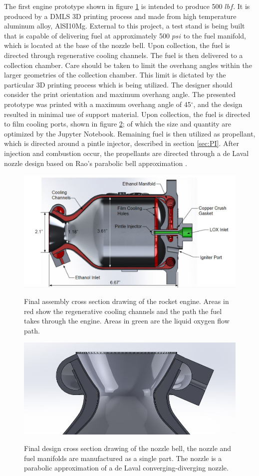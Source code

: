 \documentclass[]{aiaa-tc}%
\begin{document}
The first engine prototype shown in figure \ref{fig:nozzlecross} is intended to produce 500 $lbf$. It is produced by a DMLS 3D printing process and made from high temperature aluminum alloy, AlSI10Mg. External to this project, a test stand  is being built that is capable of delivering fuel at approximately 500 $psi$ to the fuel manifold, which is located at the base of the nozzle bell. Upon collection, the fuel is directed through regenerative cooling channels. The fuel is then delivered to a collection chamber. Care should be taken to limit the overhang angles within the larger geometries of the collection chamber. This limit is dictated by the particular 3D printing process which is being utilized. The designer should consider the print orientation and maximum overhang angle. The presented prototype was printed with a maximum overhang angle of 45$^\circ$, and the design resulted in minimal use of support material. Upon collection, the fuel is directed to film cooling ports, shown in figure \ref{fig:designcross}; of which the size and quantity are optimized by the Jupyter Notebook. Remaining fuel is then utilized as propellant, which is directed around a pintle injector, described in section \ref{sec:PI}. After injection and combustion occur, the propellants are directed through a de Laval nozzle design based on Rao's parabolic bell approximation \cite{rao1961recent}.

\begin{figure}[ht]
\centering
   {\includegraphics[width=.85\textwidth]{nozzlecross}}
    \caption{Final assembly cross section drawing of the rocket engine. Areas in red show the regenerative cooling channels and the path the fuel takes through the engine. Areas in green are the liquid oxygen flow path.}
    \label{fig:nozzlecross}
\end{figure}


\begin{figure}[ht!]
\centering
    {\includegraphics[width=.65\textwidth]{designcross}}
    \caption{Final design cross section drawing of the nozzle bell, the nozzle and fuel manifolds are manufactured as a single part. The nozzle is a parabolic approximation of a de Laval converging-diverging nozzle.}
    \label{fig:designcross}
\end{figure}
\end{document}
